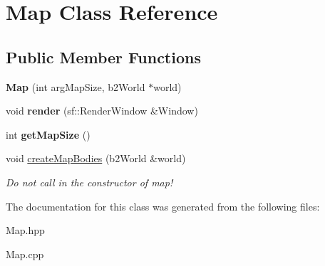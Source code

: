 \hypertarget{class_map}{\section{Map Class Reference}
\label{class_map}
}
\subsection*{Public Member Functions}
\begin{DoxyCompactItemize}
\item 
\hypertarget{class_map_a3e104473a3b574971e843a025e0e05bd}{{\bfseries Map} (int arg\-Map\-Size, b2\-World $\ast$world)}\label{class_map_a3e104473a3b574971e843a025e0e05bd}

\item 
\hypertarget{class_map_a58b5deaadf39f7bada29153f2f5395d9}{void {\bfseries render} (sf\-::\-Render\-Window \&Window)}\label{class_map_a58b5deaadf39f7bada29153f2f5395d9}

\item 
\hypertarget{class_map_a839effe30ba3687f91bd5d559ea065dd}{int {\bfseries get\-Map\-Size} ()}\label{class_map_a839effe30ba3687f91bd5d559ea065dd}

\item 
\hypertarget{class_map_a52759e6f15c7d73e9073c0811439adfb}{void \hyperlink{class_map_a52759e6f15c7d73e9073c0811439adfb}{create\-Map\-Bodies} (b2\-World \&world)}\label{class_map_a52759e6f15c7d73e9073c0811439adfb}

\begin{DoxyCompactList}\small\item\em Do not call in the constructor of map! \end{DoxyCompactList}\end{DoxyCompactItemize}


The documentation for this class was generated from the following files\-:\begin{DoxyCompactItemize}
\item 
Map.\-hpp\item 
Map.\-cpp\end{DoxyCompactItemize}
